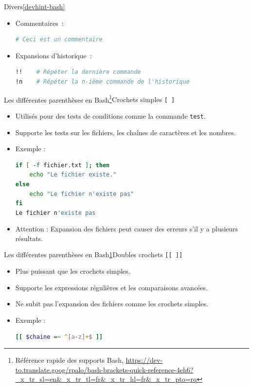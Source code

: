 \documentclass{beamer}
\begin{document}
    \begin{frame}[fragile]{Divers\cref{devhint-bash}}
        \begin{itemize}
            \item Commentaires~:
            \begin{lstlisting}[language=bash]
# Ceci est un commentaire
            \end{lstlisting}
            \item Expansions d'historique~:
            \begin{lstlisting}[language=bash]
!!    # Répéter la dernière commande
!n    # Répéter la n-ième commande de l'historique
            \end{lstlisting}
        \end{itemize}
    \end{frame}


    \begin{frame}[fragile]{Les différentes parenthèses en Bash\footnote{\label{penthesisbash}Référence rapide des supports Bash, \url{https://dev-to.translate.goog/rpalo/bash-brackets-quick-reference-4eh6?_x_tr_sl=en&_x_tr_tl=fr&_x_tr_hl=fr&_x_tr_pto=rq}}}{Crochets simples \texttt{[ ]}}
        \begin{itemize}
            \item Utilisés pour des tests de conditions comme la commande \lstinline{test}.
            \item Supporte les tests sur les fichiers, les chaînes de caractères et les nombres.
            \item Exemple :
            \begin{lstlisting}[language=bash]
if [ -f fichier.txt ]; then
    echo "Le fichier existe."
else
    echo "Le fichier n'existe pas"
fi
Le fichier n'existe pas
            \end{lstlisting}
            \item Attention : Expansion des fichiers peut causer des erreurs s'il y a plusieurs résultats.
        \end{itemize}
    \end{frame}

    \begin{frame}[fragile]{Les différentes parenthèses en Bash\cref{penthesisbash}}{Doubles crochets \texttt{[[ ]]}}
        \begin{itemize}
            \item Plus puissant que les crochets simples.
            \item Supporte les expressions régulières et les comparaisons avancées.
            \item Ne subit pas l'expansion des fichiers comme les crochets simples.
            \item Exemple :
            \begin{lstlisting}[language=bash]
[[ $chaine =~ ^[a-z]+$ ]]
            \end{lstlisting}
        \end{itemize}
    \end{frame}
\end{document}
